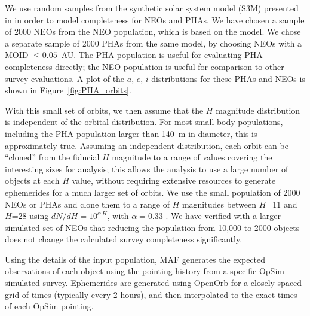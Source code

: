 We use random samples from the synthetic solar system model (S3M) presented in \cite{Grav2011} in order to model completeness for NEOs and PHAs. We have chosen a sample of 2000 NEOs from the \cite{Grav2011} NEO population, which is based on the \cite{Bottke2002} model. We chose a separate sample of 2000 PHAs from the same model, by choosing NEOs with a MOID $\le 0.05$~AU. The PHA population is useful for evaluating PHA completeness directly; the NEO population is useful for comparison to other survey evaluations. A plot of the $a$, $e$, $i$ distributions for these PHAs and NEOs is shown in Figure~\ref{fig:PHA_orbits}.

With this small set of orbits, we then assume that the $H$ magnitude distribution is independent of the orbital distribution. For most small body populations, including the PHA population larger than 140~m in diameter, this is approximately true. Assuming an independent distribution, each orbit can be ``cloned'' from the fiducial $H$ magnitude to a range of values covering the interesting sizes for analysis; this allows the analysis to use a large number of objects at each $H$ value, without requiring extensive resources to generate ephemerides for a much larger set of orbits. We use the small population of 2000 NEOs or PHAs and clone them to a range of $H$ magnitudes between $H$=11 and $H$=28 using $dN/dH = 10^{\alpha\, H}$, with $\alpha=0.33$ \citep{2017Icar..284..114S}. We have verified with a larger simulated set of NEOs that reducing the population from 10,000 to 2000 objects does not change the calculated survey completeness significantly.

Using the details of the input population, MAF generates the expected observations of each object using the pointing history
from a specific OpSim simulated survey. Ephemerides are generated using OpenOrb \citep{OpenOrb2009} for a closely spaced grid
of times (typically every 2 hours), and then interpolated to the exact times of each OpSim pointing.


